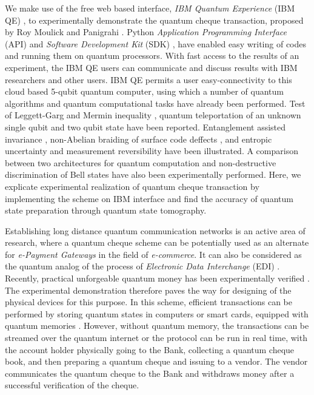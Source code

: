 \documentclass[aps,pra,twocolumn,groupedaddress,showpacs,showkeys]{revtex4-1}
\begin{document}
We make use of the free web based interface, \emph{IBM Quantum Experience} (IBM QE) \cite{IBM}, to experimentally demonstrate the quantum cheque transaction, proposed by Roy Moulick and Panigrahi \cite{SRM1}. Python \emph{Application Programming Interface} (API) and \emph{Software Development Kit} (SDK) \cite{QX17x}, have enabled easy writing of codes and running them on quantum processors. With fast access to the results of an experiment, the IBM QE users can communicate and discuss results with IBM researchers and other users. IBM QE permits a user easy-connectivity to this cloud \cite{IBM1} based 5-qubit quantum computer, using which a number of quantum algorithms \cite{QA1, QA2, QA3, QA4} and quantum computational tasks \cite{Devitt} have already been performed. Test of Leggett-Garg \cite{Huffman} and Mermin inequality \cite{Alsina}, quantum teleportation of an unknown single qubit \cite{Fedortchenko} and two qubit state \cite{Anirban0} have been reported. Entanglement assisted invariance \cite{Deffner}, non-Abelian braiding of surface code deffects \cite{Wootton}, and entropic uncertainty and measurement reversibility \cite{Berta} have been illustrated. A comparison between two architectures for quantum computation \cite{Linke} and non-destructive discrimination of Bell states \cite{Anirban} have also been experimentally performed. Here, we explicate experimental realization of quantum cheque transaction by implementing the scheme on IBM interface and find the accuracy of quantum state preparation through quantum state tomography.

Establishing long distance quantum communication networks \cite{Mor, Duan} is an active area of research, where a quantum cheque scheme \cite{SRM1} can be potentially used as an alternate for \emph{e-Payment Gateways} in the field of \emph{e-commerce}. It can also be considered as the quantum analog of the process of \emph{Electronic Data Interchange} (EDI) \cite{EDI}. Recently, practical unforgeable quantum money has been experimentally verified \cite{Nori,Diamanti}. The experimental demonstration therefore paves the way for designing of the physical devices for this purpose. In this scheme, efficient transactions can be performed by storing quantum states in computers or smart cards, equipped with quantum memories \cite{Trugenberger, Simon}. However, without quantum memory, the transactions can be streamed over the quantum internet \cite{Nemoto, Kimble} or the protocol can be run in real time, with the account holder physically going to the Bank, collecting a quantum cheque book, and then preparing a quantum cheque and issuing to a vendor. The vendor communicates the quantum cheque to the Bank and withdraws money after a successful verification of the cheque.
\end{document}
